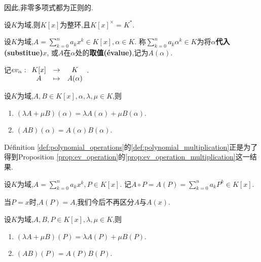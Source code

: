 \begin{rqq}
    因此,非零多项式都为正则的.
\end{rqq}

\begin{prop}
    设$K$为域,则$K[x]$为整环,且$K[x]^{\times} = K^*$.
\end{prop}

\begin{deff}
    设$K$为域,$A = \sum\limits_{k = 0} ^ n a_k x ^ k \in K[x], \alpha \in K$.
    称$\sum\limits_{k = 0} ^ n a_k \alpha ^ k \in K$为将$\alpha$\textbf{代入(substitue)}$x$,
    或$A$在$\alpha$处的\textbf{取值(évalue)},记为$A(\alpha)$.

    记$ev_{\alpha}: \begin{array}[t]{ccc} K[x] & \to & K \\ A & \mapsto & A(\alpha) \end{array}$.
\end{deff}

\begin{prop}\label{prop:ev_operation}
    设$K$为域,$A, B \in K[x], \alpha, \lambda, \mu \in K$,则
    \begin{enumerate}
        \item $(\lambda A + \mu B)(\alpha) = \lambda A(\alpha) + \mu B(\alpha)$.
        \item $(AB)(\alpha) = A(\alpha)B(\alpha)$.\label{prop:ev_operation_multiplication}
    \end{enumerate}
\end{prop}

\begin{rqq}
    Définition \ref{def:polynomial_operations}的\ref{def:polynomial_multiplication}正是为了
    得到Proposition \ref{prop:ev_operation}的\ref{prop:ev_operation_multiplication}这一结果.
\end{rqq}

\begin{deff}
    设$K$为域,$A = \sum\limits_{k = 0}^n a_k x^k, P \in K[x]$.
    记$A \circ P = A(P) = \sum\limits_{k=0}^n a_k P^k \in K[x]$.
\end{deff}

\begin{rqq}
    当$P = x$时,$A(P) = A$,我们今后不再区分$A$与$A(x)$.
\end{rqq}

\begin{rqq}
    设$K$为域,$A, B, P \in K[x], \lambda, \mu \in K$,则
    \begin{enumerate}
        \item $(\lambda A + \mu B)(P) = \lambda A(P) + \mu B(P)$.
        \item $(AB)(P) = A(P)B(P)$.
    \end{enumerate}
\end{rqq}

